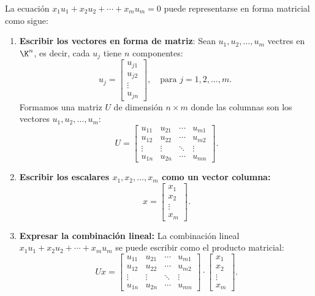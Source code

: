 \begin{enumerate}[label=\color{red}\textbf{\arabic*)}]
    La ecuación $x_1u_1+x_2u_2+\cdots+x_m u_m=0$ puede representarse en forma matricial como sigue:
    \begin{enumerate}[label=\arabic*)]
        \item \textbf{Escribir los vectores en forma de matriz}: Sean $u_1,u_2,\dots,u_m$ vectres en $\K^n$, es decir, cada $u_j$ tiene $n$ componentes: \[
        u_j=\begin{bmatrix} 
        u_{j1}\\
        u_{j 2}\\
        \vdots\\
        u_{jn}
    \end{bmatrix},\quad \text{para $j=1,2,\dots,m$. }
        \] 
        Formamos una matriz $U$ de dimensión $n\times m$ donde las columnas son los vectores $u_1,u_2,\dots,u_m$: \[
        U=\begin{bmatrix} 
            u_{11} & u_{21} & \cdots & u_{m1}\\
            u_{12} & u_{22} & \cdots & u_{m2}\\
            \vdots & \vdots & \ddots & \vdots\\
            u_{1n} & u_{2n} & \cdots & u_{mn}
        \end{bmatrix}. 
        \] 
    \item \textbf{Escribir los escalares $x_1,x_2,\dots,x_m$ como un vector columna:} \[
    x=\begin{bmatrix} 
    x_1\\
    x_2\\
    \vdots\\
    x_m
    \end{bmatrix} .
    \]  
\item \textbf{Expresar la combinación lineal:} La combinación lineal $x_1u_1+x_2u_2+\cdots+x_m u_m$ se puede escribir como el producto matricial: \[
Ux=\begin{bmatrix} 
            u_{11} & u_{21} & \cdots & u_{m1}\\
            u_{12} & u_{22} & \cdots & u_{m2}\\
            \vdots & \vdots & \ddots & \vdots\\
            u_{1n} & u_{2n} & \cdots & u_{mn}
        \end{bmatrix}\cdot\begin{bmatrix} 
    x_1\\
    x_2\\
    \vdots\\
    x_m
    \end{bmatrix}.
\]
\end{enumerate}
\end{enumerate}
